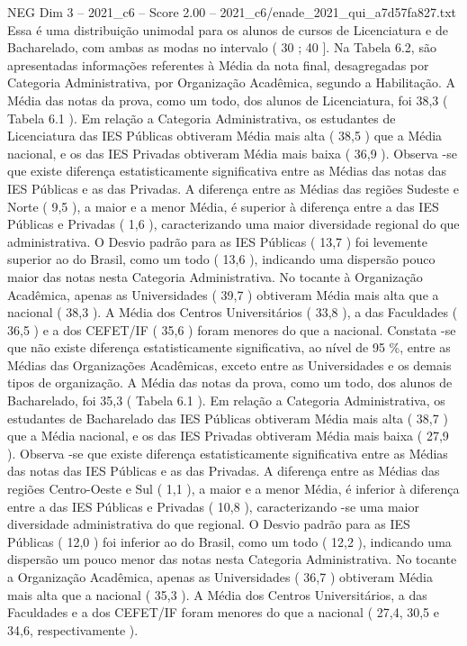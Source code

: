 \begin{textsample}{NEG Dim 3 – 2021\_c6 – Score 2.00 – 2021\_c6/enade\_2021\_qui\_a7d57fa827.txt}
Essa é uma distribuição unimodal para os alunos de cursos de Licenciatura e de Bacharelado, com ambas as modas no intervalo ( 30 ; 40 ].
Na Tabela 6.2, são apresentadas informações referentes à Média da nota final, desagregadas por Categoria Administrativa, por Organização Acadêmica, segundo a Habilitação.
A Média das notas da prova, como um todo, dos alunos de Licenciatura, foi 38,3 ( Tabela 6.1 ).
Em relação a Categoria Administrativa, os estudantes de Licenciatura das IES Públicas obtiveram Média mais alta ( 38,5 ) que a Média nacional, e os das IES Privadas obtiveram Média mais baixa ( 36,9 ).
Observa -se que existe diferença estatisticamente significativa entre as Médias das notas das IES Públicas e as das Privadas.
A diferença entre as Médias das regiões Sudeste e Norte ( 9,5 ), a maior e a menor Média, é superior à diferença entre a das IES Públicas e Privadas ( 1,6 ), caracterizando uma maior diversidade regional do que administrativa.
O Desvio padrão para as IES Públicas ( 13,7 ) foi levemente superior ao do Brasil, como um todo ( 13,6 ), indicando uma dispersão pouco maior das notas nesta Categoria Administrativa.
No tocante à Organização Acadêmica, apenas as Universidades ( 39,7 ) obtiveram Média mais alta que a nacional ( 38,3 ).
A Média dos Centros Universitários ( 33,8 ), a das Faculdades ( 36,5 ) e a dos CEFET/IF ( 35,6 ) foram menores do que a nacional.
Constata -se que não existe diferença estatisticamente significativa, ao nível de 95 \%, entre as Médias das Organizações Acadêmicas, exceto entre as Universidades e os demais tipos de organização.
A Média das notas da prova, como um todo, dos alunos de Bacharelado, foi 35,3 ( Tabela 6.1 ).
Em relação a Categoria Administrativa, os estudantes de Bacharelado das IES Públicas obtiveram Média mais alta ( 38,7 ) que a Média nacional, e os das IES Privadas obtiveram Média mais baixa ( 27,9 ).
Observa -se que existe diferença estatisticamente significativa entre as Médias das notas das IES Públicas e as das Privadas.
A diferença entre as Médias das regiões Centro-Oeste e Sul ( 1,1 ), a maior e a menor Média, é inferior à diferença entre a das IES Públicas e Privadas ( 10,8 ), caracterizando -se uma maior diversidade administrativa do que regional.
O Desvio padrão para as IES Públicas ( 12,0 ) foi inferior ao do Brasil, como um todo ( 12,2 ), indicando uma dispersão um pouco menor das notas nesta Categoria Administrativa.
No tocante a Organização Acadêmica, apenas as Universidades ( 36,7 ) obtiveram Média mais alta que a nacional ( 35,3 ).
A Média dos Centros Universitários, a das Faculdades e a dos CEFET/IF foram menores do que a nacional ( 27,4, 30,5 e 34,6, respectivamente ).

\end{textsample}
